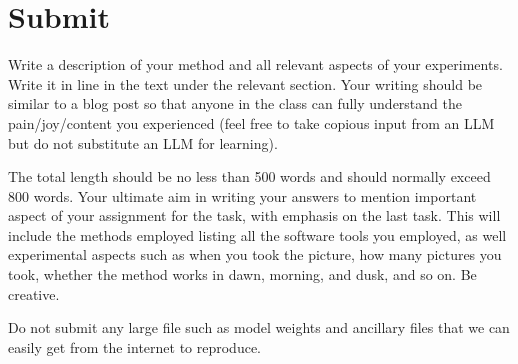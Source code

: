 \section{Submit}

Write a description of your method and all relevant aspects of your
experiments. Write it in line in the text under the relevant section.  Your writing should be similar to  a blog post so that anyone in the class can fully understand the pain/joy/content you experienced (feel free to take copious input from an LLM but do not substitute an LLM for learning).

The total length should be no less than 500 words and
should normally exceed 800 words.  Your ultimate aim in writing your answers
to mention important aspect of your assignment for the task, with
emphasis on the last task.  This will include the methods employed
listing all the software tools you employed, as well experimental
aspects such as when you took the picture, how many pictures 
you took, whether the method works in dawn, morning, and dusk, and so
on. Be creative.  

Do not submit any large file such as
model weights and ancillary files that we can easily get from the
internet to reproduce.

